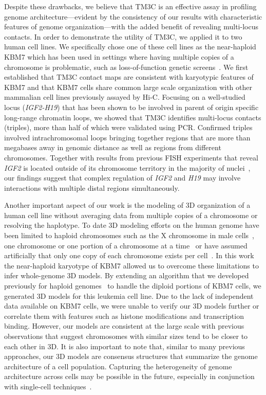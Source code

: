 Despite these drawbacks, we believe that TM3C is an effective
assay in profiling genome architecture---evident by the consistency
of our results with characteristic features of genome organization---with the
added benefit of revealing multi-locus contacts. In order to
demonstrate the utility of TM3C, we applied it to two human cell lines.
We specifically chose one of these cell lines as the near-haploid KBM7
which has been used in settings where having multiple copies of a
chromosome is problematic, such as loss-of-function genetic
screens~\cite{carette:haploid,burckstummer:reversible}. We first established that TM3C
contact maps are consistent with karyotypic features of KBM7 and
that KBM7 cells share common large scale organization with other
mammalian cell lines previously assayed by Hi-C. Focusing on
a well-studied locus (\emph{IGF2-H19}) that has been shown to be involved
in parent of origin specific long-range chromatin loops, we showed
that TM3C identifies multi-locus contacts (triples), more than half
of which were validated using PCR. Confirmed triples
involved intrachromosomal loops bringing together regions that
are more than megabases away in genomic distance as well as regions
from different chromosomes. Together with results from previous
FISH experiments that reveal \emph{IGF2} is located outside of
its chromosome territory in the majority of nuclei~\cite{mahy:gene},
our findings suggest that complex regulation of \emph{IGF2} and
\emph{H19} may involve interactions with multiple distal regions
simultaneously.

Another important aspect of our work is the modeling of 3D
organization of a human cell line without averaging data from
multiple copies of a chromosome or resolving the haplotype.
To date 3D modeling efforts on the human genome have been limited to
haploid chromosomes such as the X chromosome in male
cells~\cite{nagano:single-cell}, one chromosome or one portion of a
chromosome at a time~\cite{nagano:single-cell, bau:three-dimensional}
or have assumed artificially that only one copy of each chromosome
exists per cell~\cite{zhang:inference}.
In this work the near-haploid karyotype of KBM7 allowed us to
overcome these limitations
to infer whole-genome 3D models. By extending an algorithm that we developed
previously for haploid genomes~\cite{varoquaux:statistical} to handle the diploid
portions of KBM7 cells, we generated 3D models for this leukemia
cell line. Due to the lack of independent data available on KBM7 cells, we were unable
to verify our 3D models further or correlate them with features such
as histone modifications and transcription binding. However, our models
are consistent at the large scale with previous observations that
suggest chromosomes with similar sizes tend to be closer to each
other in 3D. It is also important to note that, similar to many previous approaches,
our 3D models are consensus structures that summarize the genome architecture of a
cell population. Capturing the heterogeneity of genome architecture across cells may be
possible in the future, especially in conjunction with single-cell techniques~\cite{nagano:single-cell}.

